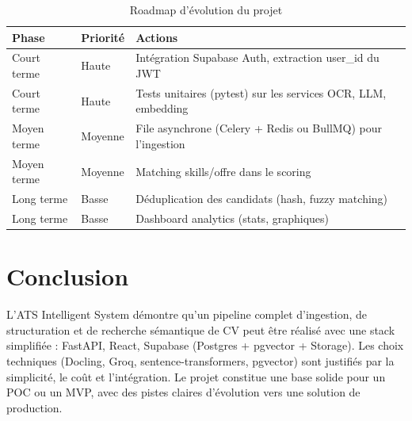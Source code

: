 \documentclass[11pt,a4paper]{report}
\begin{document}
\begin{table}[H]
  \centering
  \caption{Roadmap d'évolution du projet}
  \small
  \begin{tabular}{@{}llp{5cm}@{}}
    \toprule
    \textbf{Phase} & \textbf{Priorité} & \textbf{Actions} \\
    \midrule
    Court terme & Haute & Intégration Supabase Auth, extraction user\_id du JWT \\
    Court terme & Haute & Tests unitaires (pytest) sur les services OCR, LLM, embedding \\
    Moyen terme & Moyenne & File asynchrone (Celery + Redis ou BullMQ) pour l'ingestion \\
    Moyen terme & Moyenne & Matching skills/offre dans le scoring \\
    Long terme & Basse & Déduplication des candidats (hash, fuzzy matching) \\
    Long terme & Basse & Dashboard analytics (stats, graphiques) \\
    \bottomrule
  \end{tabular}
\end{table}

\section{Conclusion}

L'ATS Intelligent System démontre qu'un pipeline complet d'ingestion, de structuration et de recherche sémantique de CV peut être réalisé avec une stack simplifiée : FastAPI, React, Supabase (Postgres + pgvector + Storage). Les choix techniques (Docling, Groq, sentence-transformers, pgvector) sont justifiés par la simplicité, le coût et l'intégration. Le projet constitue une base solide pour un POC ou un MVP, avec des pistes claires d'évolution vers une solution de production.
\end{document}
